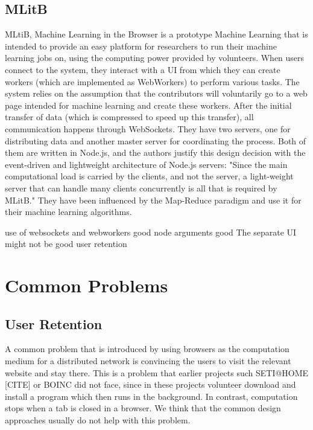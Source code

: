 \subsection{MLitB \cite{meeds2015mlitb}}
MLtiB, Machine Learning in the Browser is a prototype Machine Learning that is intended to provide an easy platform for researchers to run their machine learning jobs on, using the computing power provided by volunteers. When users connect to the system, they interact with a UI from which they can create workers (which are implemented as WebWorkers) to perform various tasks. The system relies on the assumption that the contributors will voluntarily go to a web page intended for machine learning  and create these workers. After the initial transfer of data (which is compressed to speed up this transfer), all communication happens through WebSockets. They have two servers, one for distributing data and another master server for coordinating the process. Both of them are written in Node.js, and the authors justify this design decision with the event-driven and lightweight architecture of Node.js servers: "Since the main computational load is carried by the clients, and not the server, a light-weight server that can handle many clients concurrently is all that is required by MLitB." They have been influenced by the Map-Reduce paradigm and use it for their machine learning algorithms.

use of websockets and webworkers good
node arguments good
The separate UI might not be good user retention


\section{Common Problems}
\subsection{User Retention}
A common problem that is introduced by using browsers as the computation medium for a distributed network is convincing the users to visit the relevant website and stay there. This is a problem that earlier projects such SETI@HOME [CITE] or BOINC did not face, since in these projects volunteer download and install a program which then runs in the background. In contrast, computation stops when a tab is closed in a browser. We think that the common design approaches usually do not help with this problem. 

